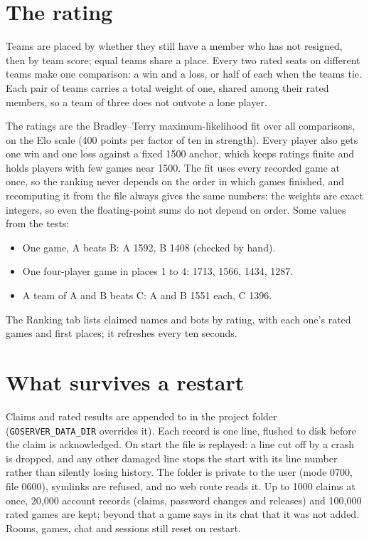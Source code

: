 \documentclass[11pt,oneside]{book}
\begin{document}
\section{The rating}
Teams are placed by whether they still have a member who has not resigned, then
by team score; equal teams share a place. Every two rated seats on different
teams make one comparison: a win and a loss, or half of each when the teams
tie. Each pair of teams carries a total weight of one, shared among their rated
members, so a team of three does not outvote a lone player.

The ratings are the Bradley--Terry maximum-likelihood fit over all comparisons,
on the Elo scale (400 points per factor of ten in strength). Every player also
gets one win and one loss against a fixed 1500 anchor, which keeps ratings
finite and holds players with few games near 1500. The fit uses every recorded
game at once, so the ranking never depends on the order in which games finished,
and recomputing it from the file always gives the same numbers: the weights are
exact integers, so even the floating-point sums do not depend on order. Some
values from the tests:
\begin{itemize}
  \item One game, A beats B: A 1592, B 1408 (checked by hand).
  \item One four-player game in places 1 to 4: 1713, 1566, 1434, 1287.
  \item A team of A and B beats C: A and B 1551 each, C 1396.
\end{itemize}
The Ranking tab lists claimed names and bots by rating, with each one's rated
games and first places; it refreshes every ten seconds.

\section{What survives a restart}
Claims and rated results are appended to  in the
project folder (\texttt{GOSERVER\_DATA\_DIR} overrides it). Each record is one
line, flushed to disk before the claim is acknowledged. On start the file is
replayed: a line cut off by a crash is dropped, and any other damaged line stops
the start with its line number rather than silently losing history. The folder
is private to the user (mode 0700, file 0600), symlinks are refused, and no web
route reads it. Up to 1000 claims at once, 20{,}000 account records (claims, password changes and releases) and 100{,}000 rated games are kept; beyond
that a game says in its chat that it was not added. Rooms, games, chat and
sessions still reset on restart.
\end{document}

